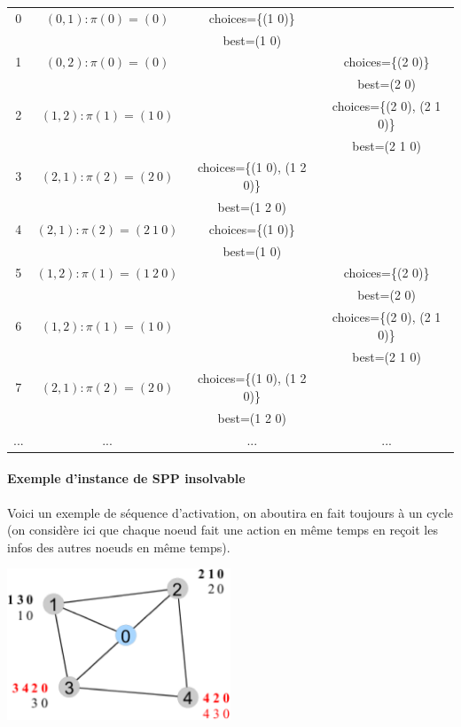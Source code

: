 \documentclass{report}
\begin{document}
\begin{tabular}{|c|c|c|c|}
  \hline
  0 & $(0, 1): \pi(0) = (0)$ & choices=\{(1 0)\} & \\
  & & best=(1 0) & \\
  \hline
  1 & $(0, 2): \pi(0) = (0)$ & & choices=\{(2 0)\} \\
  & & & best=(2 0) \\
  \hline
  2 & $(1, 2): \pi(1) = (1\ 0)$ & & choices=\{(2 0), (2 1 0)\} \\
  & & & best=(2 1 0) \\
  \hline
  3 & $(2, 1): \pi(2) = (2\ 0)$ & choices=\{(1 0), (1 2 0)\} & \\
  & & best=(1 2 0) & \\
  \hline
  4 & $(2, 1): \pi(2) = (2\ 1\ 0)$ & choices=\{(1 0)\} & \\
  & & best=(1 0) & \\
  \hline
  5 & $(1, 2): \pi(1) = (1\ 2\ 0)$ & & choices=\{(2 0)\} \\
  & & & best=(2 0) \\
  \hline
  6 & $(1, 2): \pi(1) = (1\ 0)$ & & choices=\{(2 0), (2 1 0)\} \\
  & & & best=(2 1 0) \\
  \hline
  7 & $(2, 1): \pi(2) = (2\ 0)$ & choices=\{(1 0), (1 2 0)\} & \\
  & & best=(1 2 0) & \\
  \hline
  ... & ... & ... & ... \\
\end{tabular}

\paragraph{Exemple d'instance de SPP insolvable}

Voici un exemple de séquence d'activation, on aboutira en fait
toujours à un cycle (on considère ici que chaque noeud fait une action
en même temps en reçoit les infos des autres noeuds en même temps).

\includegraphics[width=0.5\textwidth]{sppex7.eps}
\end{document}
